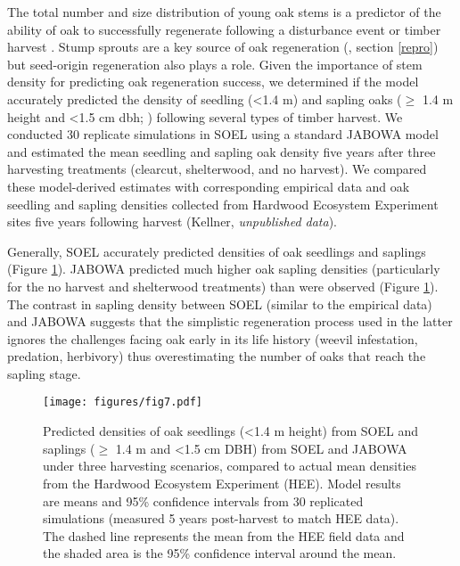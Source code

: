 \documentclass[
11pt, %
a4paper, %
oneside, %
headinclude,footinclude, %
]{scrartcl}
\begin{document}
The total number and size distribution of young oak stems is a predictor of the ability of oak to successfully regenerate following a disturbance event or timber harvest \citep{Johnson2009}. Stump sprouts are a key source of oak regeneration (\citep{Johnson2009}, section \ref{repro}) but seed-origin regeneration also plays a role. Given the importance of stem density for predicting oak regeneration success, we determined if the model accurately predicted the density of seedling (\textless 1.4 m) and sapling oaks ($\geq$ 1.4 m height and \textless 1.5 cm dbh; \citep{Saunders2013}) following several types of timber harvest. We conducted 30 replicate simulations in SOEL using a standard JABOWA model \citep{Botkin1993} and estimated the mean seedling and sapling oak density five years after three harvesting treatments (clearcut, shelterwood, and no harvest). We compared these model-derived estimates with corresponding empirical data and oak seedling and sapling densities collected from Hardwood Ecosystem Experiment sites five years following harvest (Kellner, \textit{unpublished data}). 

Generally, SOEL accurately predicted densities of oak seedlings and saplings (Figure \ref{fig:7}). JABOWA predicted much higher oak sapling densities (particularly for the no harvest and shelterwood treatments) than were observed (Figure \ref{fig:7}). The contrast in sapling density between SOEL (similar to the empirical data) and JABOWA suggests that the simplistic regeneration process used in the latter ignores the challenges facing oak early in its life history (weevil infestation, predation, herbivory) thus overestimating the number of oaks that reach the sapling stage.

\begin{figure}
	\centering
	\texttt{[image: figures/fig7.pdf]}
	\caption{Predicted densities of oak seedlings (\textless 1.4 m height) from SOEL and saplings ($\geq$ 1.4 m and \textless 1.5 cm DBH) from SOEL and JABOWA under three harvesting scenarios, compared to actual mean densities from the Hardwood Ecosystem Experiment (HEE). Model results are means and 95\% confidence intervals from 30 replicated simulations (measured 5 years post-harvest to match HEE data). The dashed line represents the mean from the HEE field data and the shaded area is the 95\% confidence interval around the mean.}
	\label{fig:7}
\end{figure}


\renewcommand{\refname}{\spacedlowsmallcaps{References}} %



\end{document}
